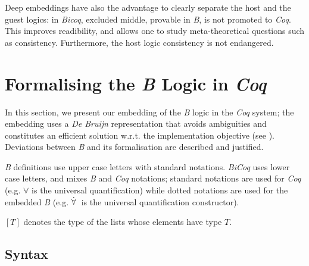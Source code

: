 \documentclass{llncs}
\begin{document}
Deep embeddings have also the advantage to clearly separate the host and the guest logics: in 
\emph{Bicoq}, excluded middle, provable in \emph{B}, is not promoted to \emph{Coq}. This 
improves readibility, and allows one to study meta-theoretical questions such as consistency. 
Furthermore, the host logic consistency is not endangered.

\section{Formalising the \emph{B} Logic in \emph{Coq}}\label{sc_formal}

In this section, we present our embedding of the \emph{B} logic in the \emph{Coq} system; the 
embedding uses a \emph{De Bruijn} representation that avoids ambiguities and constitutes an 
efficient solution w.r.t. the implementation objective (see \cite{deb:1,lia:1}). Deviations 
between \emph{B} and its formalisation are described and justified.

\begin{notation}\small\emph{B} definitions use upper case letters with standard notations.
\emph{BiCoq} uses lower case letters, and mixes \emph{B} and \emph{Coq} notations; standard 
notations are used for \emph{Coq} (e.g. $\forall$ is the universal quantification) while 
dotted notations are used for the embedded \emph{B} (e.g. $\dot{\forall}\:$ is the universal
quantification constructor).
\end{notation}

\begin{notation}\small$[T]$ denotes the type of the lists whose elements have type $T$.
\end{notation}

\subsection{Syntax}\label{ss_syntax}
\end{document}
